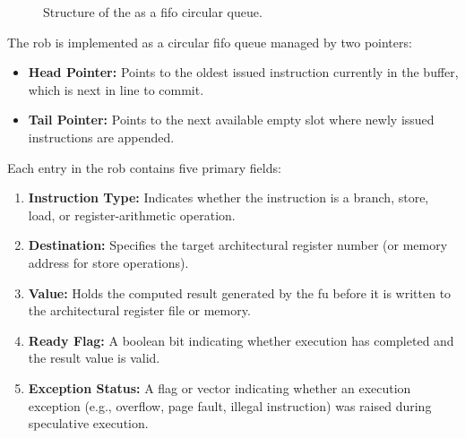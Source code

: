\begin{figure}[htpb]
\centering
{}
\caption{Structure of the  as a \gls{fifo} circular queue.}
\label{fig:rob_circular_queue}
\end{figure}

The \gls{rob} is implemented as a circular \gls{fifo} queue managed by two pointers:
\begin{itemize}
    \item \textbf{Head Pointer:} Points to the oldest issued instruction currently in the buffer, which is next in line to commit.
    \item \textbf{Tail Pointer:} Points to the next available empty slot where newly issued instructions are appended.
\end{itemize}

Each entry in the \gls{rob} contains five primary fields:
\begin{enumerate}
    \item \textbf{Instruction Type:} Indicates whether the instruction is a branch, store, load, or register-arithmetic operation.
    \item \textbf{Destination:} Specifies the target architectural register number (or memory address for store operations).
    \item \textbf{Value:} Holds the computed result generated by the \gls{fu} before it is written to the architectural register file or memory.
    \item \textbf{Ready Flag:} A boolean bit indicating whether execution has completed and the result value is valid.
    \item \textbf{Exception Status:} A flag or vector indicating whether an execution exception (e.g., overflow, page fault, illegal instruction) was raised during speculative execution.
\end{enumerate}

